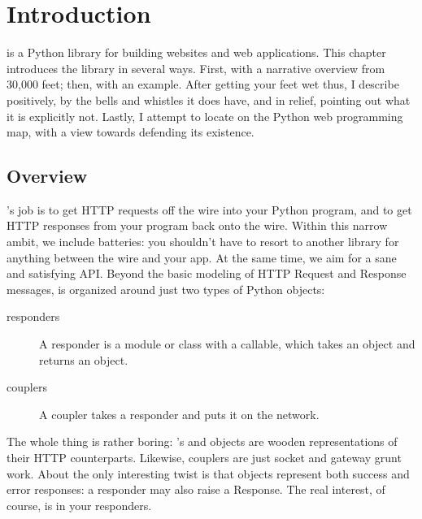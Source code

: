 \chapter{Introduction \label{introduction}}

 is a Python library for building websites and web applications.
This chapter introduces the library in several ways. First, with a narrative
overview from 30,000 feet; then, with an example. After getting your feet wet
thus, I describe  positively, by the bells and whistles it does
have, and in relief, pointing out what it is explicitly not. Lastly, I attempt
to locate  on the Python web programming map, with a view towards
defending its existence.


\section{Overview \label{overview}}

's job is to get HTTP requests off the wire into your Python
program, and to get HTTP responses from your program back onto the wire. Within
this narrow ambit, we include batteries: you shouldn't have to resort to another
library for anything between the wire and your app. At the same time, we aim for
a sane and satisfying API. Beyond the basic modeling of HTTP Request and
Response messages,  is organized around just two types of Python
objects:

\begin{description}

\item[responders]
    {A responder is a module or class with a  callable, which
    takes an  object and returns an 
    object.}

\item[couplers]
    {A coupler takes a responder and puts it on the network.}

\end{description}

The whole thing is rather boring: 's  and
 objects are wooden representations of their HTTP counterparts.
Likewise, couplers are just socket and gateway grunt work. About the only
interesting twist is that  objects represent both success and
error responses: a responder may also raise a Response. The real interest, of
course, is in your responders.



